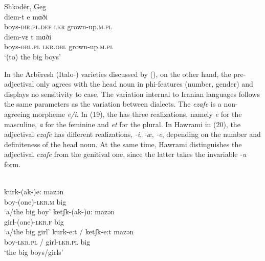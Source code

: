 \documentclass[output=paper]{langsci/langscibook}
\begin{document}
\ea%
    Shkodër, Geg \label{ex:manzini:18}\\
    \ea
    \gll diem-t     e   mɑði     \\
         boys-\textsc{dir.pl.def}  \textsc{lkr}  grown-up.\textsc{m.pl}  \\
    \ex
    \gll diem-vɛ    t     mɑði \\
         boys-\textsc{obl.pl}     \textsc{lkr.obl}  grown-up.\textsc{m.pl}\\
    \glt ‘(to) the big boys’  
    \z
\z

In the Arbëresh (Italo-) varieties discussed by \citeauthor{Manzini2011Grammatical}\linebreak (\citeyear{Manzini2011Grammatical}), on the other hand, the pre-ad\-jec\-ti\-val  only agrees with the head noun in phi-features (number, gender) and displays no sensitivity to case. The variation internal to Iranian languages follows the same parameters as the variation between  dialects. The  \textit{ezafe} is a non-agreeing morpheme \textit{e\slash i}. In   (19), the  has three realizations, namely \textit{e} for the masculine, \textit{a} for the feminine and \textit{et} for the plural. In Hawrami  in (20), the adjectival \textit{ezafe} has different realizations, \textit{{}-i}, \textit{{}-æ}, \textit{{}-e}, depending on the number and definiteness of the head noun. At the same time, Hawrami  distinguishes the adjectival \textit{ezafe} from the genitival one, since the latter takes the invariable -\textit{u} form.

\ea%
      \citep{Franco2015}\label{ex:manzini:19}\\
    \ea
    \gll kurk-(ak-)e:     mazən       \\
         boy-(one)-\textsc{lkr.m}    big     \\
    \glt ‘a/the big boy’
    \ex
    \gll ketʃk-(ak-)ɑ:    mazən      \\
         girl-(one)-\textsc{lkr.f}   big     \\
    \glt ‘a/the big girl’
    \ex
    \gll kurk-e:t / ketʃk-e:t     mazən     \\
         boy-\textsc{lkr.pl} / girl-\textsc{lkr.pl}  big   \\
    \glt ‘the big boys/girls’
    \z
\z
\end{document}
